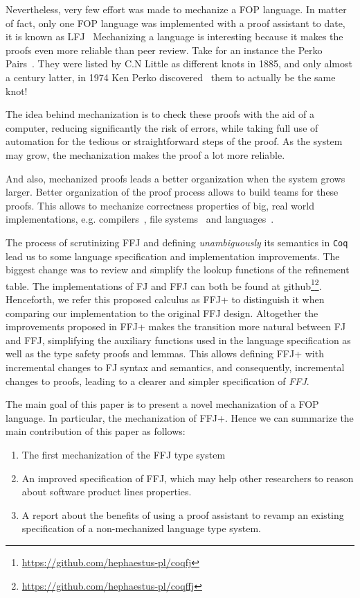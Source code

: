 Nevertheless, very few effort was made to mechanize a \gls{FOP} language. In matter of fact, only one
\gls{FOP} language was implemented with a proof assistant to date, it is known as LFJ~\cite{delaware2009machine}
Mechanizing a language is interesting because it makes the proofs even more reliable than peer review.
Take for an instance the Perko Pairs~\cite{little1900xxx}. 
They were listed by C.N Little as different knots in 1885, and only almost a century latter, 
in 1974 Ken Perko discovered~\cite{rolfsen1976knots} them to actually be the same knot!

The idea behind mechanization is to check these proofs with the aid of a computer, reducing significantly the risk of errors, while 
taking full use of automation for the tedious or straightforward steps of the proof. As the system may grow, the mechanization makes
the proof a lot more reliable.

And also, mechanized proofs leads a better organization when the system grows larger.
Better organization of the proof process allows to build teams for these proofs. 
This allows to mechanize correctness properties of big, real world implementations, e.g. compilers~\cite{leroy2012compcert}, 
file systems~\cite{arkoudas2004verifying, amani2015specifying} and languages~\cite{hartel2000formalising, klein2006machine}. 

The process of scrutinizing \gls{FFJ} and defining \textit{unambiguously} its semantics in \texttt{Coq} 
lead us to some language specification and implementation improvements. The biggest change was to review and
simplify the lookup functions of the refinement table.
The implementations of \gls{FJ} and \gls{FFJ} can both be found at github\footnote{\url{https://github.com/hephaestus-pl/coqfj}}\footnote{\url{https://github.com/hephaestus-pl/coqffj}}.
Henceforth, we refer this proposed calculus as \gls{FFJ+} to distinguish it when comparing our implementation to the original \gls{FFJ} design.
Altogether the improvements proposed in \gls{FFJ+} makes the transition more natural between \gls{FJ} and \gls{FFJ}, 
simplifying the auxiliary functions used in the language specification as well as the type safety proofs and lemmas. 
This allows defining \gls{FFJ+} with incremental changes to \gls{FJ} syntax and semantics, 
and consequently, incremental changes to proofs, leading to a clearer and simpler specification of \textit{FFJ}.


The main goal of this paper is to present a novel mechanization of a \gls{FOP} language. In particular, the mechanization of \gls{FFJ+}.
Hence we can summarize the main contribution of this paper as follows:
\begin{enumerate}
    \item The first mechanization of the \gls{FFJ} type system
    \item An improved specification of \gls{FFJ}, which may help other researchers to reason about software product lines properties.
    \item A report about the benefits of using a proof assistant to revamp an existing specification of a non-mechanized language type system.
\end{enumerate}

